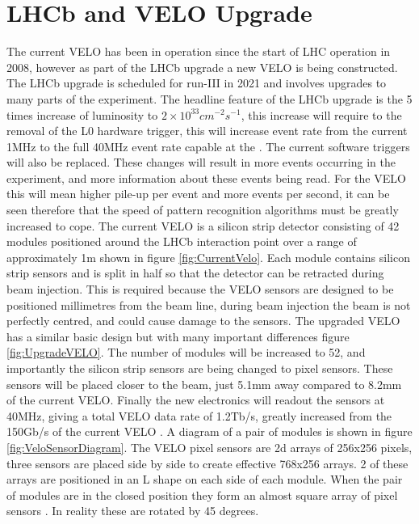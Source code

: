 
\section{LHCb and VELO Upgrade}  %

The current VELO has been in operation since the start of LHC operation in 2008, however as part of the LHCb upgrade a new VELO is being constructed. The LHCb upgrade is scheduled for run-III in 2021 \cite{Hennessy2016LHCbUpgrade} and involves upgrades to many parts of the experiment. 
The headline feature of the LHCb upgrade is the 5 times increase of luminosity to \(2\times10^{33} cm^{-2} s^{-1}\), this increase will require to the removal of the L0 hardware trigger, this will increase event rate from the current 1MHz to the full 40MHz event rate capable at the \cite{LHCCollaboration:1624070}. The current software triggers will also be replaced. These changes will result in more events occurring in the experiment, and more information about these events being read. For the VELO this will mean higher pile-up per event and more events per second, it can be seen therefore that the speed of pattern recognition algorithms must be greatly increased to cope.
The current VELO is a silicon strip detector consisting of 42 modules positioned around the LHCb interaction point over a range of approximately 1m shown in figure \ref{fig:CurrentVelo}. Each module contains silicon strip sensors and is split in half so that the detector can be retracted during beam injection. This is required because the VELO sensors are designed to be positioned millimetres from the beam line, during beam injection the beam is not perfectly centred, and could cause damage to the sensors. 
The upgraded VELO has a similar basic design but with many important differences figure \ref{fig:UpgradeVELO}. The number of modules will be increased to 52, and importantly the silicon strip sensors are being changed to pixel sensors. These sensors will be placed closer to the beam, just 5.1mm away compared to 8.2mm of the current VELO. Finally the new electronics will readout the sensors at 40MHz, giving a total VELO data rate of 1.2Tb/s, greatly increased from the 150Gb/s of the current VELO \cite{Hennessy2016LHCbUpgrade}. 
A diagram of a pair of modules is shown in figure \ref{fig:VeloSensorDiagram}. The VELO pixel sensors are 2d arrays of 256x256 pixels, three sensors are placed side by side to create effective 768x256 arrays. 2 of these arrays are positioned in an L shape on each side of each module. When the pair of modules are in the closed position they form an almost square array of pixel sensors \cite{Bird:1620453}. In reality these are rotated by 45 degrees.

